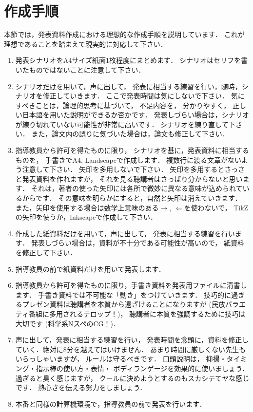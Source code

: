 \documentclass[a4j,12pt,dvipdfmx,oneside]{jsbook}
\theoremstyle{definition}
\begin{document}
\section{作成手順}\label{sec:presen_make}
%
%
%
本節では，発表資料作成における理想的な作成手順を説明しています．
これが理想であることを踏まえて現実的に対応して下さい．
\begin{enumerate}
\item 発表シナリオをA4サイズ紙面1枚程度にまとめます．
シナリオはセリフを書いたものではないことに注意して下さい．
\item シナリオ\underline{だけ}を用いて，声に出して，
発表に相当する練習を行い，随時，シナリオを修正していきます．
ここで発表時間は気にしないで下さい．
気にすべきことは，論理的思考に基づいて，
不足内容を，
分かりやすく，
正しい日本語を用いた説明ができるか否かです．
発表しづらい場合は，シナリオが練り切れていない可能性が非常に高いです．
シナリオを練り直して下さい．
また，論文内の誤りに気づいた場合は，論文も修正して下さい．
\item 指導教員から許可を得たものに限り，
シナリオを基に，発表資料に相当するものを，
手書きでA4, Landscapeで作成します．
複数行に渡る文章がないよう注意して下さい．
矢印を多用しないで下さい．
矢印を多用するとさっさと発表資料を作れますが，
それを見る聴講者はさっぱり分からないと思います．
それは，著者の使った矢印には各所で微妙に異なる意味が込められているからです．
その意味を明らかにすると，自然と矢印は消えていきます．
また，矢印を使用する場合は数学上意味のある$\to$, $\Leftarrow$を使わないで，
TikZの矢印を使うか，Inkscapeで作成して下さい．
\item 作成した紙資料\underline{だけ}を用いて，声に出して，
発表に相当する練習を行います．
発表しづらい場合は，資料が不十分である可能性が高いので，
紙資料を修正して下さい．
\item 指導教員の前で紙資料だけを用いて発表します．
\item 指導教員から許可を得たものに限り，手書き資料を発表用ファイルに清書します．
手書き資料では不可能な「動き」をつけていきます．
技巧的に過ぎるプレゼン資料は聴講者を本質から遠ざけることになりますが
(民放バラエティ番組に多用されるテロップ！)，
聴講者に本質を強調するために技巧は大切です
(科学系NスペのCG！)．
\item 声に出して，発表に相当する練習を行い，
発表時間を念頭に，資料を修正していく．絶対に8分を越えてはいけません．
あまり時間に厳しくない先生もいらっしゃいますが，
ルールは守るべきです．
口頭説明は，
抑揚・タイミング・指示棒の使い方・表情・
ボディランゲージを効果的に使いましょう．
過ぎると臭く感じますが，
クールに決めようとするのもスカシテてヤな感じです．
熱心さを伝える努力をしましょう．
\item 本番と同様の計算機環境で，指導教員の前で発表を行います．
\end{enumerate}
%
%
%
\end{document}

